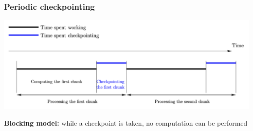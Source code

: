 \begin{frame}
  \frametitle{Periodic checkpointing}

\begin{center}
  \includegraphics[width=.9\textwidth]{PeriodicCoordinatedCkpt.png}%
 \end{center}

\textbf{Blocking model:} while a checkpoint is taken, no computation can be performed
  
\end{frame}


 



    
